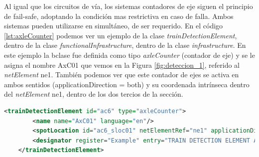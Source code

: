     Al igual que los circuitos de vía, los sistemas contadores de eje siguen el principio de fail-safe, adoptando la condición mas restrictiva en caso de falla. Ambos sistemas pueden utilizarse en simultáneo, de ser requerido. En el código \ref{lst:axleCounter} podemos ver un ejemplo de la clase \textit{trainDetectionElement}, dentro de la clase \textit{functionalInfrastructure}, dentro de la clase \textit{infrastructure}. En este ejemplo la bclase fue definida como tipo \textit{axleCounter} (contador de eje) y se le asigna el nombre AxC01 que vemos en la Figura \ref{fig:deteccion_1}, referido al \textit{netElement} ne1. También podemos ver que este contador de ejes se activa en ambos sentidos (applicationDirection = both) y su coordenada intrínseca dentro del \textit{netElement} ne1, dentro de los dos tercios de la sección.

    \begin{lstlisting}[language = XML, caption = Clase \textit{TrainDetectionElement} , label = {lst:axleCounter}]
    <trainDetectionElement id="ac6" type="axleCounter">
        <name name="AxC01" language="en"/>
        <spotLocation id="ac6_sloc01" netElementRef="ne1" applicationDirection="both" intrinsicCoord="0.6710"/>
        <designator register="Example" entry="TRAIN DETECTION ELEMENT AxC01"/>
    </trainDetectionElement>
    \end{lstlisting}